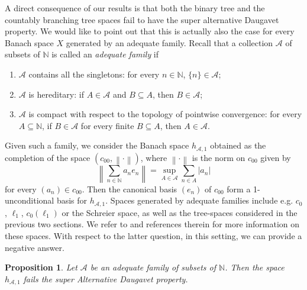 \documentclass[11pt,a4paper,reqno]{amsart}
\numberwithin{equation}{section}
\newcommand{\abs}[1]{\left\lvert#1\right\rvert}
\newcommand{\norm}[1]{\left\lVert#1\right\rVert}
\newcommand{\N}{\mathbb{N}}
\newcommand{\A}{\mathcal{A}}
\newcommand{\1}{\mathbbm{1}}
\theoremstyle{plain}
\newtheorem{proposition}[theorem]{Proposition}
\theoremstyle{definition}
\begin{document}
A direct consequence of our results is that both the binary tree and the countably branching tree spaces fail to have the super alternative Daugavet property. We would like to point out that this is actually also the case for every Banach space $X$ generated by an adequate family. Recall that a collection $\A$ of subsets of $\N$ is called an \emph{adequate family} if \begin{enumerate}
    \item $\A$ contains all the singletons: for every $n\in \N$, $\{n\}\in\A$;
    \item $\A$ is hereditary: if $A\in\A$ and $B\subseteq A$, then $B\in\A$;
    \item $\A$ is compact with respect to the topology of pointwise convergence: for every $A\subseteq\N$, if $B\in\A$ for every finite $B\subseteq A$, then $A\in\A$. 
\end{enumerate} Given such a family, we consider the Banach space $h_{\A,1}$ obtained as the completion of the space $(c_{00},\norm{\cdot})$, where $\norm{\cdot}$ is the norm on $c_{00}$ given by \begin{equation*}
    \norm{\sum_{n\in\N}a_ne_n}=\sup_{A\in\A} \sum_{n\in A}\abs{a_n}
\end{equation*}for every $(a_n)\in c_{00}$. Then the canonical basis $(e_n)$ of $c_{00}$ form a 1-unconditional basis for $h_{\A,1}$. Spaces generated by adequate families include e.g. $c_0$, $\ell_1$, $c_0(\ell_1)$ or the Schreier space, as well as the tree-spaces considered in the previous two sections. We refer to \cite{ABC21,ALM} and references therein for more information on these spaces. With respect to the latter question, in this setting, we can provide a negative answer. 

\begin{proposition}
 Let $\A$ be an adequate family of subsets of $\N$. Then the space $h_{\A,1}$ fails the super Alternative Daugavet property.
\end{proposition}
\end{document}
